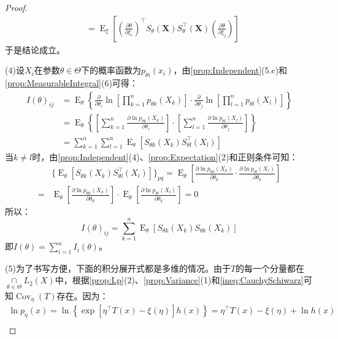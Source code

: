 \begin{proof}
\begin{align*}
		&=\operatorname{E}_{\xi}\left[\left(\frac{\partial\theta}{\partial\xi_i}\right)^{\top}S_{\theta}( \mathbf{X})S_{\theta}^{\top}( \mathbf{X})\left(\frac{\partial\theta}{\partial\xi_j}\right)\right]
	\end{align*}
	于是结论成立。\par
	(4)设$X_i$在参数$\theta\in\Theta$下的概率函数为$p_{\theta i}(x_i)$，由\cref{prop:Independent}(5.c)和\cref{prop:MeasurableIntegral}(6)可得：
	\begin{align*}
		I(\theta)_{ij}&=\operatorname{E}_{\theta}\left\{\frac{\partial}{\partial\theta_i}\ln\left[\prod_{k=1}^{n}p_{\theta k}(X_k)\right]\cdot\frac{\partial}{\partial\theta_j}\ln\left[\prod_{l=1}^{n}p_{\theta l}(X_l)\right]\right\} \\
		&=\operatorname{E}_{\theta}\left\{\left[\sum_{k=1}^{n}\frac{\partial\ln p_{\theta k}(X_k)}{\partial\theta_i}\right]\cdot\left[\sum_{l=1}^{n}\frac{\partial\ln p_{\theta l}(X_l)}{\partial\theta_j}\right]\right\} \\
		&=\sum_{k=1}^{n}\sum_{l=1}^{n}\operatorname{E}_{\theta}[S_{\theta k}(X_k)S_{\theta l}^{\top}(X_l)]
	\end{align*}
	当$k\ne l$时，由\cref{prop:Independent}(4)、\cref{prop:Expectation}(2)和正则条件可知：
	\begin{align*}
		&\{\operatorname{E}_{\theta}[S_{\theta k}(X_k)S_{\theta l}^{\top}(X_l)]\}_{p q}=\operatorname{E}_{\theta}\left[\frac{\partial\ln p_{\theta k}(X_k)}{\partial\theta_p}\cdot\frac{\partial\ln p_{\theta l}(X_l)}{\partial\theta_q}\right] \\
		=&\operatorname{E}_{\theta}\left[\frac{\partial\ln p_{\theta k}(X_k)}{\partial\theta_p}\right]\cdot\operatorname{E}_{\theta}\left[\frac{\partial\ln p_{\theta l}(X_l)}{\partial\theta_q}\right]=0
	\end{align*}
	所以：
	\begin{equation*}
		I(\theta)_{ij}=\sum_{k=1}^{n}\operatorname{E}_{\theta}[S_{\theta k}(X_k)S_{\theta k}(X_k)]
	\end{equation*}
	即$I(\theta)=\sum\limits_{i=1}^{n}I_i(\theta)$。\par
	(5)为了书写方便，下面的积分展开式都是多维的情况。由于$T$的每一个分量都在$\underset{\theta\in\Theta}{\cap}L_2(X)$中，根据\cref{prop:Lp}(2)、\cref{prop:Variance}(1)和\cref{ineq:CauchySchiwarz}可知$\operatorname{Cov}_{\eta}(T)$存在。因为：
	\begin{gather*}
		\ln p_{\eta}(x)=\ln\left\{\exp\left[\eta^{\top}T(x)-\xi(\eta)\right]h(x)\right\}=\eta^{\top}T(x)-\xi(\eta)+\ln h(x) \\

\end{gather*}
\end{proof}
